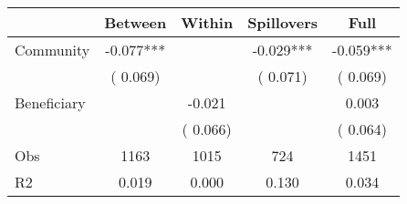 
\begin{tabular}{l*{4}{c}}\hline&\multicolumn{1}{c}{Between}&\multicolumn{1}{c}{Within}&\multicolumn{1}{c}{Spillovers}&\multicolumn{1}{c}{Full}\\ \hline
 Community             &             -0.077***      &                                               &       -0.029*** &        -0.059***                            \\ 
                               &        (       0.069)           &                                       &       (       0.071)     &      (       0.069)                                           \\ 
 Beneficiary   &                                               &       -0.021    &                                &             0.003                            \\ 
                               &                                               & (       0.066)                  &                                        &      (       0.064)                                           \\ 
\hline                                                                                                                                                                                                                                            
 Obs                   &               1163               &       1015                       &       724                &              1451                                               \\ 
 R2                    &                      0.019              &              0.000                      &              0.130               &                     0.034                                              \\ 
\hline \end{tabular}                                                                                                                                                                                                              